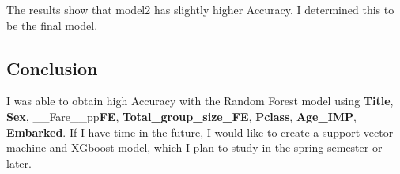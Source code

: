 \documentclass[
]{article}
\begin{document}
The results show that model2 has slightly higher Accuracy. I determined
this to be the final model.

\hypertarget{conclusion}{%
\subsection{\texorpdfstring{\textbf{Conclusion}}{Conclusion}}\label{conclusion}}

I was able to obtain high Accuracy with the Random Forest model using
\textbf{Title}, \textbf{Sex}, \_\_Fare\_\_pp\textbf{FE},
\textbf{Total\_group\_size\_FE}, \textbf{Pclass}, \textbf{Age\_IMP},
\textbf{Embarked}. If I have time in the future, I would like to create
a support vector machine and XGboost model, which I plan to study in the
spring semester or later.
\end{document}
